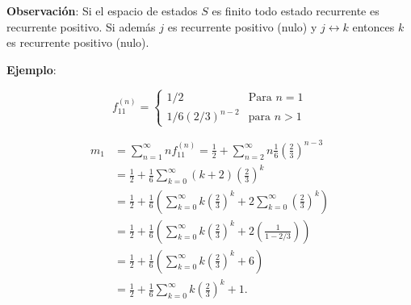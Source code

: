 \documentclass[12pt,a4paper]{article}
\begin{document}
\textbf{Observación}: Si el espacio de estados $S$ es finito todo estado recurrente es recurrente positivo. Si además $j$ es recurrente positivo (nulo) y $j \leftrightarrow k$ entonces $k$ es recurrente positivo (nulo).

\textbf{Ejemplo}:

\begin{center}
\end{center}

\begin{equation*}
f_{11}^{(n)} = \begin{cases}
1/2 & \text{Para } n=1 \\
1/6 (2/3)^{n-2} & \text{para } n>1
\end{cases}
\end{equation*}

\begin{align*}
m_1 &= \sum_{n=1}^{\infty} n f_{11}^{(n)} = \frac{1}{2} + \sum_{n=2}^{\infty} n \frac{1}{6} \left(\frac{2}{3}\right)^{n-3} \\
&= \frac{1}{2} + \frac{1}{6} \sum_{k=0}^{\infty} (k+2) \left(\frac{2}{3}\right)^k \\
&= \frac{1}{2} + \frac{1}{6} \left(\sum_{k=0}^{\infty} k \left(\frac{2}{3}\right)^k + 2 \sum_{k=0}^{\infty} \left(\frac{2}{3}\right)^k\right) \\
&= \frac{1}{2} + \frac{1}{6} \left(\sum_{k=0}^{\infty} k \left(\frac{2}{3}\right)^k + 2 \left(\frac{1}{1 - 2/3}\right)\right) \\
&= \frac{1}{2} + \frac{1}{6} \left(\sum_{k=0}^{\infty} k \left(\frac{2}{3}\right)^k + 6\right) \\
&= \frac{1}{2} + \frac{1}{6} \sum_{k=0}^{\infty} k \left(\frac{2}{3}\right)^k + 1.
\end{align*}
\end{document}
